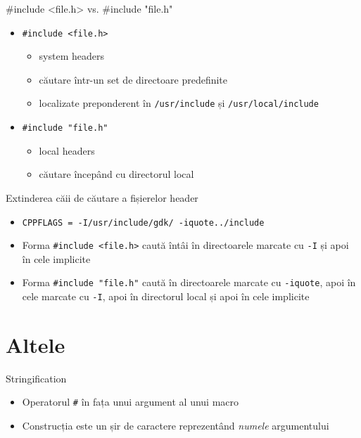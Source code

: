 \documentclass{beamer}
\begin{document}
\begin{frame}{\#include \textless{}file.h\textgreater{} vs. \#include "file.h"}
	\begin{itemize}
		\pause \item \texttt{\#include \textless{}file.h\textgreater{}}
			\begin{itemize}
				\item system headers
				\item căutare într-un set de directoare predefinite
				\item localizate preponderent în \texttt{/usr/include} și
\texttt{/usr/local/include}
			\end{itemize}
		\pause \item \texttt{\#include "file.h"}
			\begin{itemize}
				\item local headers
				\item căutare începând cu directorul local
			\end{itemize}
	\end{itemize}
\end{frame}

\begin{frame}{Extinderea căii de căutare a fișierelor header}
	\begin{itemize}
		\item \texttt{CPPFLAGS = -I/usr/include/gdk/ -iquote../include}
		\item Forma \texttt{\#include \textless{}file.h\textgreater{}} caută
întâi în directoarele marcate cu \texttt{-I} și apoi în cele implicite
		\item Forma \texttt{\#include "file.h"} caută în directoarele marcate
cu \texttt{-iquote}, apoi în cele marcate cu \texttt{-I}, apoi în directorul
local și apoi în cele implicite
	\end{itemize}
\end{frame}

\section{Altele}

\frame{\tableofcontents[currentsection]}

\begin{frame}{Stringification}
	\begin{itemize}
		\pause \item Operatorul \texttt{\#} în fața unui argument al unui macro
		\pause \item Construcția este un șir de caractere reprezentând \textit{numele} argumentului
	\end{itemize}

	\pause 
\end{frame}
\end{document}
